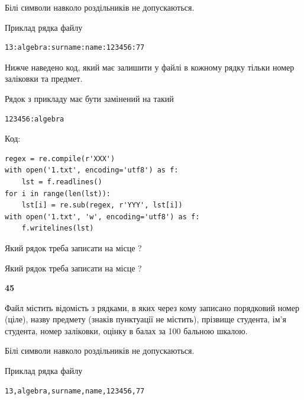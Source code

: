Білі символи навколо роздільників не допускаються.

Приклад рядка файлу



\begin{verbatim}
13:algebra:surname:name:123456:77
\end{verbatim}


Нижче наведено код, який має залишити у файлі в кожному рядку тільки номер заліковки та предмет.

Рядок з прикладу має бути замінений на такий



\begin{verbatim}
123456:algebra
\end{verbatim}




Код:



\begin{verbatim}
regex = re.compile(r'XXX')
with open('1.txt', encoding='utf8') as f:
    lst = f.readlines()
for i in range(len(lst)):
    lst[i] = re.sub(regex, r'YYY', lst[i])
with open('1.txt', 'w', encoding='utf8') as f:
    f.writelines(lst)
\end{verbatim}









Який рядок треба записати на місце  ?\par
\vspace{5mm}


Який рядок треба записати на місце  ?\par


\newpage

{\begin {center}\textbf{ 45}\end {center}}\par
Файл  містить відомість з рядками, в яких через кому записано поряд\-ковий номер (ціле), назву предмету (знаків пунктуації не містить), прізвище студента, ім'я студента, номер заліковки, оцінку в балах за 100 бальною шкалою.

Білі символи навколо роздільників не допускаються.

Приклад рядка файлу



\begin{verbatim}
13,algebra,surname,name,123456,77
\end{verbatim}


